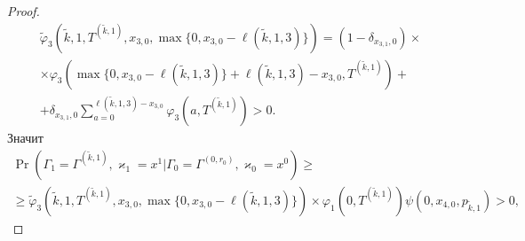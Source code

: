 \documentclass[a4paper,12pt,russian]{extarticle}
\begin{document}
\begin{proof}
\begin{multline*}
\widetilde{\varphi}_3(\tilde{k},1,T^{(\tilde{k},1)},x_{3,0},\max{\{0,x_{3,0} - \ell(\tilde{k},1,3)\}})= (1-\delta_{x_{3,1},0}) \times \\\times\varphi_3(\max{\{0,x_{3,0} - \ell(\tilde{k},1,3)\}} + \ell (\tilde{k},1,3) - x_{3,0},T^{(\tilde{k},1)} ) 
+\\+\delta_{x_{3,1},0} \sum_{a=0}^{\ell(\tilde{k},1,3)-x_{3,0}}\varphi_3 (a,T^{(\tilde{k},1)})>0.
\end{multline*}
Значит
\begin{multline*}
\Pr(\Gamma_{1}=\Gamma^{(\tilde{k},1)}, \varkappa_{1}=x^1|
\Gamma_{0}=\Gamma^{(0,r_0)}, \varkappa_{0}=x^0)\geqslant \\
\geqslant \widetilde{\varphi}_3(\tilde{k},1,T^{(\tilde{k},1)},x_{3,0},\max{\{0,x_{3,0} - \ell(\tilde{k},1,3)\}})
\times
\varphi_1(0,T^{(\tilde{k},1)})  \psi(0,x_{4,0}, p_{\tilde{k},1}) > 0,
\end{multline*}


\end{proof}
\end{document}
